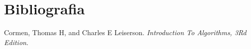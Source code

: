 \section{Bibliografia}

\begin{thebibliography}{1}
	\bibitem{}Cormen, Thomas H, and Charles E Leiserson. \textit{Introduction To Algorithms, 3Rd Edition}. 
\end{thebibliography}


